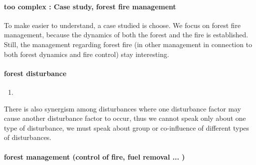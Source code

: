 \documentclass{article}
\begin{document}

\paragraph{too complex : Case study, forest fire management \\}

To make easier to understand, a case studied is choose. We focus on forest fire management, because the dynamics of both the forest and the fire is established. Still, the management regarding forest fire (in other management in connection to both forest dynamics and fire control) stay interesting.



\newpage


\paragraph{forest disturbance}

\begin{enumerate}
    \item 
\end{enumerate}


There is also synergism among disturbances where one disturbance factor may cause
another disturbance factor to occur, thus we cannot speak only about one type of disturbance, we must speak about group or co-influence of different types of disturbances. \cite{mandre_environmental_2011}


\paragraph{forest management (control of fire, fuel removal ... )}
\end{document}

